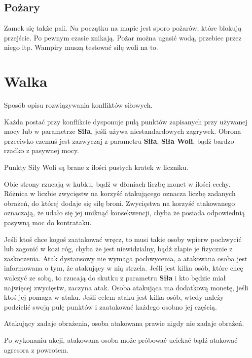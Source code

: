 	\subsection{Pożary}
		Zamek się także pali. Na początku na mapie jest sporo pożarów, które blokują przejście.
		Po pewnym czasie znikają.
		Pożar można ugasić wodą, przebiec przez niego itp.
		Wampiry muszą testować siłę woli na to.

\section{Walka}
	Sposób opisu rozwiązywania konfliktów siłowych.
	
	Każda postać przy konflikcie dysponuje pulą punktów zapisanych przy używanej mocy lub w parametrze \textbf{Siła}, jeśli używa niestandardowych zagrywek.
	Obrona przeciwko czemuś jest zazwyczaj z parametru \textbf{Siła}, \textbf{Siła Woli}, bądź bardzo rzadko z pasywnej mocy.
	
	Punkty Siły Woli są brane z ilości pustych kratek w liczniku.
	
	Obie strony rzucają w kubku, bądź w dłoniach liczbę monet w ilości cechy.
	Różnica w liczbie zwycięstw na korzyść atakującego oznacza liczbę zadanych obrażeń, do której dodaje się siłę broni.
	Zwycięstwa na korzyść atakowanego oznaczają, że udało się jej uniknąć konsekwencji, chyba że posiada odpowiednią pasywną moc do kontrataku.
	
	Jeśli ktoś chce kogoś zaatakować wręcz, to musi takie osoby wpierw pochwycić lub zagonić w kozi róg, chyba że jest niewidzialny, bądź złapie je fizycznie z zaskoczenia.
	Atak dystansowy nie wymaga pochwycenia, a atakowana osoba jest informowana o tym, że atakujący w nią strzela.
	Jeśli jest kilka osób, które chcę walczyć ze sobą, to rzucają do skutku z parametru \textbf{Siła} i kto będzie miał najwięcej zwycięstw, zaczyna atak.
	Osoba atakująca ma dodatkową monetę, jeśli ktoś jej pomaga w ataku.
	Jeśli celem ataku jest kilka osób, wtedy należy podzielić swoją pulę punktów i zaatakować każdego osobno jej częścią.
	
	Atakujący zadaje obrażenia, osoba atakowana prawie nigdy nie zadaje obrażeń.
	
	Po wykonaniu akcji, atakowana osoba może próbować uciekać bądź atakować agresora z powrotem.

